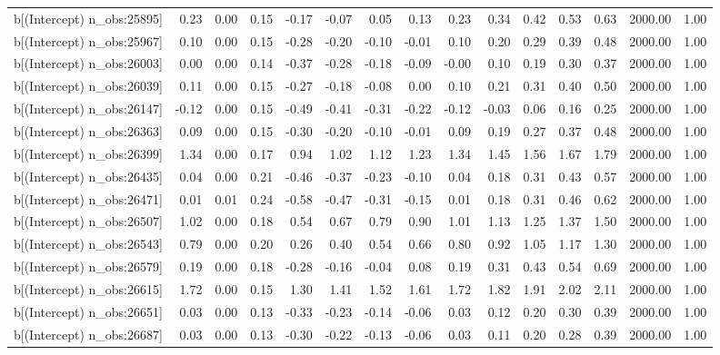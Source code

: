 \begin{table}[ht]
\begin{tabular}{rrrrrrrrrrrrrrr}
  b[(Intercept) n\_obs:25895] & 0.23 & 0.00 & 0.15 & -0.17 & -0.07 & 0.05 & 0.13 & 0.23 & 0.34 & 0.42 & 0.53 & 0.63 & 2000.00 & 1.00 \\ 
  b[(Intercept) n\_obs:25967] & 0.10 & 0.00 & 0.15 & -0.28 & -0.20 & -0.10 & -0.01 & 0.10 & 0.20 & 0.29 & 0.39 & 0.48 & 2000.00 & 1.00 \\ 
  b[(Intercept) n\_obs:26003] & 0.00 & 0.00 & 0.14 & -0.37 & -0.28 & -0.18 & -0.09 & -0.00 & 0.10 & 0.19 & 0.30 & 0.37 & 2000.00 & 1.00 \\ 
  b[(Intercept) n\_obs:26039] & 0.11 & 0.00 & 0.15 & -0.27 & -0.18 & -0.08 & 0.00 & 0.10 & 0.21 & 0.31 & 0.40 & 0.50 & 2000.00 & 1.00 \\ 
  b[(Intercept) n\_obs:26147] & -0.12 & 0.00 & 0.15 & -0.49 & -0.41 & -0.31 & -0.22 & -0.12 & -0.03 & 0.06 & 0.16 & 0.25 & 2000.00 & 1.00 \\ 
  b[(Intercept) n\_obs:26363] & 0.09 & 0.00 & 0.15 & -0.30 & -0.20 & -0.10 & -0.01 & 0.09 & 0.19 & 0.27 & 0.37 & 0.48 & 2000.00 & 1.00 \\ 
  b[(Intercept) n\_obs:26399] & 1.34 & 0.00 & 0.17 & 0.94 & 1.02 & 1.12 & 1.23 & 1.34 & 1.45 & 1.56 & 1.67 & 1.79 & 2000.00 & 1.00 \\ 
  b[(Intercept) n\_obs:26435] & 0.04 & 0.00 & 0.21 & -0.46 & -0.37 & -0.23 & -0.10 & 0.04 & 0.18 & 0.31 & 0.43 & 0.57 & 2000.00 & 1.00 \\ 
  b[(Intercept) n\_obs:26471] & 0.01 & 0.01 & 0.24 & -0.58 & -0.47 & -0.31 & -0.15 & 0.01 & 0.18 & 0.31 & 0.46 & 0.62 & 2000.00 & 1.00 \\ 
  b[(Intercept) n\_obs:26507] & 1.02 & 0.00 & 0.18 & 0.54 & 0.67 & 0.79 & 0.90 & 1.01 & 1.13 & 1.25 & 1.37 & 1.50 & 2000.00 & 1.00 \\ 
  b[(Intercept) n\_obs:26543] & 0.79 & 0.00 & 0.20 & 0.26 & 0.40 & 0.54 & 0.66 & 0.80 & 0.92 & 1.05 & 1.17 & 1.30 & 2000.00 & 1.00 \\ 
  b[(Intercept) n\_obs:26579] & 0.19 & 0.00 & 0.18 & -0.28 & -0.16 & -0.04 & 0.08 & 0.19 & 0.31 & 0.43 & 0.54 & 0.69 & 2000.00 & 1.00 \\ 
  b[(Intercept) n\_obs:26615] & 1.72 & 0.00 & 0.15 & 1.30 & 1.41 & 1.52 & 1.61 & 1.72 & 1.82 & 1.91 & 2.02 & 2.11 & 2000.00 & 1.00 \\ 
  b[(Intercept) n\_obs:26651] & 0.03 & 0.00 & 0.13 & -0.33 & -0.23 & -0.14 & -0.06 & 0.03 & 0.12 & 0.20 & 0.30 & 0.39 & 2000.00 & 1.00 \\ 
  b[(Intercept) n\_obs:26687] & 0.03 & 0.00 & 0.13 & -0.30 & -0.22 & -0.13 & -0.06 & 0.03 & 0.11 & 0.20 & 0.28 & 0.39 & 2000.00 & 1.00 \\ 

\end{tabular}
\end{table}

